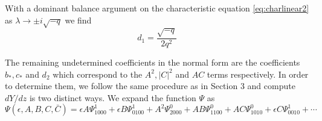 With a dominant balance argument on the characteristic equation \eqref{eq:charlinear2} as  $\lambda \rightarrow \pm i \sqrt{-q}$ we find
\begin{equation}
d_1 = \frac{\sqrt{-q}}{2 q^2} 
\end{equation}


The remaining undetermined coefficients  in the normal form are the 
coefficients $b_*,c_*$ and $d_2$ 
which correspond to the $A^2, |C|^2$ and $AC$ terms respectively. In 
order to determine them, we follow the same procedure as 
in Section 3 and compute $dY/dz$ is two distinct ways. We expand the
function $\Psi$ as
\begin{equation}\label{eq:psiexpms2}
\Psi(\epsilon,A,B,C,\bar{C}) = \epsilon A \Psi_{1000}^1 + \epsilon B \Psi_{0100}^1 + A^2 \Psi_{2000}^0 + A B \Psi_{1100}^0 + A C \Psi_{1010}^0 + \epsilon C \Psi_{0010}^1 + \cdots 
\end{equation}

